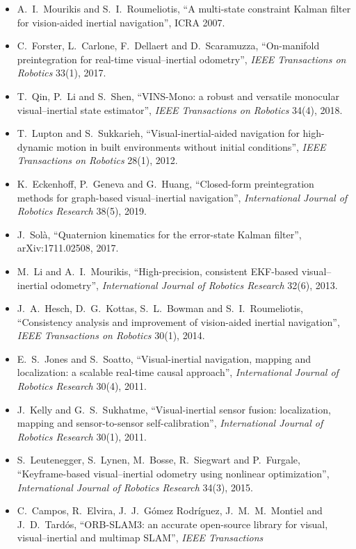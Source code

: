 \begin{description}[leftmargin=1.5em,style=nextline,font=\normalfont]
\begin{itemize}[nosep]
\item A.~I.~Mourikis and S.~I.~Roumeliotis, ``A multi-state constraint
  Kalman filter for vision-aided inertial navigation'', ICRA 2007.
\item C.~Forster, L.~Carlone, F.~Dellaert and D.~Scaramuzza,
  ``On-manifold preintegration for real-time visual--inertial odometry'',
  \emph{IEEE Transactions on Robotics} 33(1), 2017.
\item T.~Qin, P.~Li and S.~Shen, ``VINS-Mono: a robust and versatile
  monocular visual--inertial state estimator'', \emph{IEEE Transactions
  on Robotics} 34(4), 2018.
\item T.~Lupton and S.~Sukkarieh, ``Visual-inertial-aided navigation for
  high-dynamic motion in built environments without initial conditions'',
  \emph{IEEE Transactions on Robotics} 28(1), 2012.
\item K.~Eckenhoff, P.~Geneva and G.~Huang, ``Closed-form preintegration
  methods for graph-based visual--inertial navigation'',
  \emph{International Journal of Robotics Research} 38(5), 2019.
\item J.~Sol\`a, ``Quaternion kinematics for the error-state Kalman
  filter'', arXiv:1711.02508, 2017.
\item M.~Li and A.~I.~Mourikis, ``High-precision, consistent EKF-based
  visual--inertial odometry'', \emph{International Journal of Robotics
  Research} 32(6), 2013.
\item J.~A.~Hesch, D.~G.~Kottas, S.~L.~Bowman and S.~I.~Roumeliotis,
  ``Consistency analysis and improvement of vision-aided inertial
  navigation'', \emph{IEEE Transactions on Robotics} 30(1), 2014.
\item E.~S.~Jones and S.~Soatto, ``Visual-inertial navigation, mapping
  and localization: a scalable real-time causal approach'',
  \emph{International Journal of Robotics Research} 30(4), 2011.
\item J.~Kelly and G.~S.~Sukhatme, ``Visual-inertial sensor fusion:
  localization, mapping and sensor-to-sensor self-calibration'',
  \emph{International Journal of Robotics Research} 30(1), 2011.
\item S.~Leutenegger, S.~Lynen, M.~Bosse, R.~Siegwart and P.~Furgale,
  ``Keyframe-based visual--inertial odometry using nonlinear
  optimization'', \emph{International Journal of Robotics Research}
  34(3), 2015.
\item C.~Campos, R.~Elvira, J.~J.~G\'omez Rodr\'iguez, J.~M.~M.~Montiel
  and J.~D.~Tard\'os, ``ORB-SLAM3: an accurate open-source library for
  visual, visual--inertial and multimap SLAM'', \emph{IEEE Transactions
}
\end{itemize}
\end{description}

